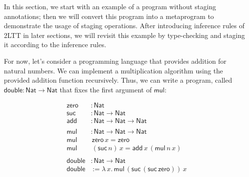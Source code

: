 
In this section, we start with an example of a program without staging annotations; then we will convert this program into a metaprogram to demonstrate the usage of staging operations. After introducing inference rules of 2LTT in later sections, we will revisit this example by type-checking and staging it according to the inference rules. 

For now, let's consider a programming language that provides addition for natural numbers. We can implement a multiplication algorithm using the provided addition function recursively. Thus, we can write a program, called $\mathsf{double}:\mathsf{Nat}\to\mathsf{Nat}$ that fixes the first argument of $\mathsf{mul}$:

$$
\begin{aligned}
    \mathsf{zero}&:\mathsf{Nat}\\
    \mathsf{suc}&:\mathsf{Nat}\to\mathsf{Nat}\\
    \mathsf{add}&:\mathsf{Nat}\to\mathsf{Nat}\to\mathsf{Nat}\\
    \\
    \mathsf{mul}&:\mathsf{Nat}\to\mathsf{Nat}\to\mathsf{Nat}\\
    \mathsf{mul}&\,\mathsf{zero}\,x=\mathsf{zero}\\
    \mathsf{mul}&\,(\mathsf{suc}\,n)\,x=\mathsf{add}\,x\,(\mathsf{mul}\,n\,x)\\
    \\
    \mathsf{double}&:\mathsf{Nat}\to\mathsf{Nat}\\
    \mathsf{double}&:=\lambda\,x.\,\mathsf{mul}\,(\mathsf{suc}\,(\mathsf{suc}\,\mathsf{zero}))\,x\\
\end{aligned}
$$

